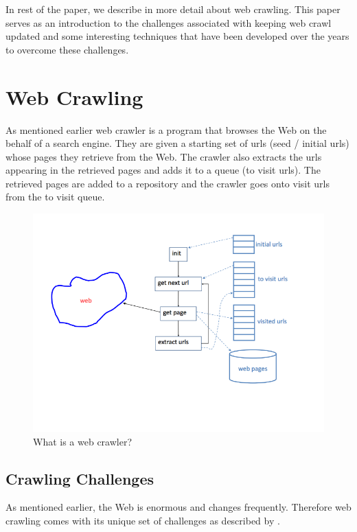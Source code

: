 \documentclass[a4paper, 11pt]{article} %
\begin{document}
In rest of the paper, we describe in more detail about web crawling. This paper serves as an introduction to the challenges associated with keeping web crawl updated and some interesting techniques that have been developed over the years to overcome these challenges. \\


\section{Web Crawling}

As mentioned earlier web crawler is a program that browses the Web on the behalf of a search engine. They are given a starting set of urls (seed / initial urls) whose pages they retrieve from the Web. The crawler also extracts the urls appearing in the retrieved pages and adds it to a queue (to visit urls). The retrieved pages are added to a repository and the crawler goes onto visit urls from the to visit queue. \cite{baeza1999modern} 

\begin{figure}[h] %
\begin{center}
\includegraphics[width=1\textwidth]{webcrawling.png}
\end{center}
\caption{What is a web crawler?}
\end{figure}

\subsection{Crawling Challenges}

As mentioned earlier, the Web is enormous and changes frequently. Therefore web crawling comes with its unique set of challenges as described by \cite{arasu2001searching}.
\end{document}
